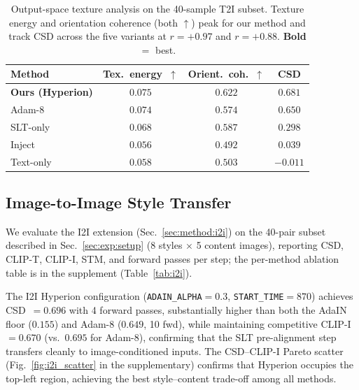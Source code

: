 \begin{table}[t]
  \centering
  \caption{Output-space texture analysis on the 40-sample T2I subset. Texture
           energy and orientation coherence (both $\uparrow$) peak for our method
           and track CSD across the five variants at $r{=}{+}0.97$ and
           $r{=}{+}0.88$. \textbf{Bold} $=$ best.}
  \label{tab:texcoh}
  \footnotesize
  \begin{tabular}{lccc}
    \toprule
    Method & Tex.\ energy~$\uparrow$ & Orient.\ coh.~$\uparrow$ & CSD \\
    \midrule
    \rowcolor{tabshade!10}
    \textbf{Ours (Hyperion)} & $\mathbf{0.075}$ & $\mathbf{0.622}$ & $0.681$ \\
    Adam-8                 & $0.074$ & $0.574$ & $0.650$ \\
    SLT-only               & $0.068$ & $0.587$ & $0.298$ \\
    Inject                 & $0.056$ & $0.492$ & $0.039$ \\
    Text-only              & $0.058$ & $0.503$ & $-0.011$ \\
    \bottomrule
  \end{tabular}
\end{table}

\subsection{Image-to-Image Style Transfer}
\label{sec:exp:i2i}

We evaluate the I2I extension (Sec.~\ref{sec:method:i2i}) on the 40-pair
subset described in Sec.~\ref{sec:exp:setup} (8 styles $\times$ 5 content
images), reporting CSD, CLIP-T, CLIP-I, STM, and forward passes per step; the
per-method ablation table is in the supplement (Table~\ref{tab:i2i}).

The I2I Hyperion configuration (\texttt{ADAIN\_ALPHA}$=0.3$,
\texttt{START\_TIME}$=870$) achieves CSD~$=0.696$ with 4 forward passes,
substantially higher than both the AdaIN floor ($0.155$) and Adam-8 ($0.649$, 10 fwd),
while maintaining competitive CLIP-I~$=0.670$ (vs.\ $0.695$ for Adam-8),
confirming that the SLT pre-alignment step transfers cleanly to
image-conditioned inputs.
The CSD--CLIP-I Pareto scatter (Fig.~\ref{fig:i2i_scatter} in the
supplementary) confirms that Hyperion occupies the top-left region, achieving
the best style--content trade-off among all methods.

